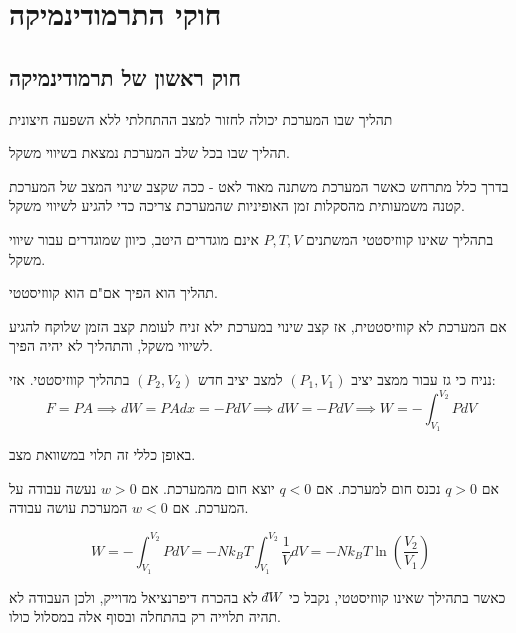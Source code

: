 \documentclass{tstextbook}
\begin{document}
\section{חוקי התרמודינמיקה}

\subsection{חוק ראשון של תרמודינמיקה}

\begin{definition}
תהליך שבו המערכת יכולה לחזור למצב ההתחלתי ללא השפעה חיצונית

\end{definition}
\begin{definition}
תהליך שבו בכל שלב המערכת נמצאת בשיווי משקל.

\end{definition}
בדרך כלל מתרחש כאשר המערכת משתנה מאוד לאט - ככה שקצב שינוי המצב של המערכת קטנה משמעותית מהסקלות זמן האופיניות שהמערכת צריכה כדי להגיע לשיווי משקל. 

\begin{remark}
בתהליך שאינו קווזיסטטי המשתנים \(P,T,V\) אינם מוגדרים היטב, כיוון שמוגדרים עבור שיווי משקל.

\end{remark}
\begin{proposition}
תהליך הוא הפיך אם"ם הוא קווזיסטטי.

\end{proposition}
אם המערכת לא קווזיסטטית, אז קצב שינוי במערכת ילא זניח לעומת קצב הזמן שלוקח להגיע לשיווי משקל, והתהליך לא יהיה הפיך.

\begin{proposition}[עבודה של גז]
נניח כי גז עבור ממצב יציב \((P_{1},V_{1})\) למצב יציב חדש \((P_{2},V_{2})\) בתהליך קווזיסטטי. אזי:
$$F=PA\implies dW = PAdx=-PdV\implies dW=-PdV\implies W=-\int_{V_{1}}^{V_{2}}PdV$$

\end{proposition}
\begin{remark}
באופן כללי זה תלוי במשוואת מצב.

\end{remark}
\begin{proposition}
אם \(q>0\) נכנס חום למערכת. 
אם \(q<0\) יוצא חום מהמערכת.
אם \(w>0\) נעשה עבודה על המערכת.
אם \(w<0\) המערכת עושה עבודה.

\end{proposition}
\begin{proposition}
$$W=-\int_{V_{1}}^{V_{2}}PdV=-Nk_{B}T\int_{V_{1}}^{V_{2}} \frac{1}{V}dV=-Nk_{B}T\ln\left( \frac{V_{2}}{V_{1}} \right)$$

\end{proposition}
כאשר בתהילך שאינו קווזיסטטי, נקבל כי \(\;\bar{}\mkern-7.5mu dW\)  לא בהכרח דיפרנציאל מדוייק, ולכן העבודה לא תהיה תלוייה רק בהתחלה ובסוף אלה במסלול כולו.
\end{document}
